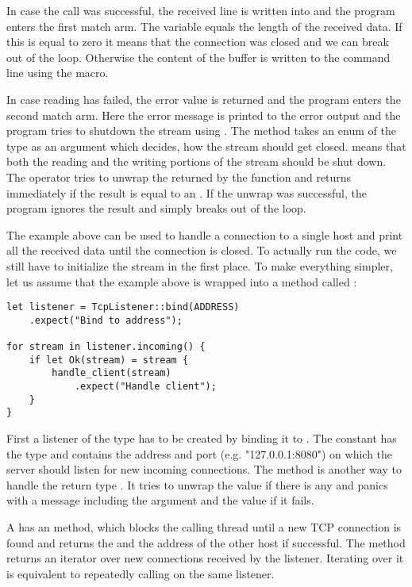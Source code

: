 In case the call was successful, the received line is written into  and the program enters the first match
arm. The variable  equals the length of the received data. If this is equal to zero it means that the
connection was closed and we can break out of the loop. Otherwise the content of the buffer is written to the command
line using the  macro.

In case reading has failed, the error value is returned and the program enters the second match arm. Here the error
message is printed to the error output and the program tries to shutdown the stream using
. The method takes an enum of the type  as an argument which
decides, how the stream should get closed.  means that both the reading and the writing portions of the
stream should be shut down. The  operator tries to unwrap the  returned by the function and
returns immediately if the result is equal to an . If the unwrap was successful, the program ignores the
result and simply breaks out of the loop.

The example above can be used to handle a connection to a single host and print all the received data until the
connection is closed. To actually run the code, we still have to initialize the stream in the first place. To make
everything simpler, let us assume that the example above is wrapped into a method called
:

\begin{verbatim}
let listener = TcpListener::bind(ADDRESS)
    .expect("Bind to address");

for stream in listener.incoming() {
    if let Ok(stream) = stream {
        handle_client(stream)
            .expect("Handle client");
    }
}
\end{verbatim}

First a listener of the type  has to be created by binding it to . The
constant  has the type  and contains the address and port (e.g. "127.0.0.1:8080") on which the
server should listen for new incoming connections. The method  is another way to handle the return type
. It tries to unwrap the  value if there is any and panics with a message including the argument
and the  value if it fails.

A  has an  method, which blocks the calling thread until a new TCP connection is found
and returns the  and the address of the other host if successful. The method  returns an
iterator over new connections received by the listener. Iterating over it is equivalent to repeatedly calling
 on the same listener.


